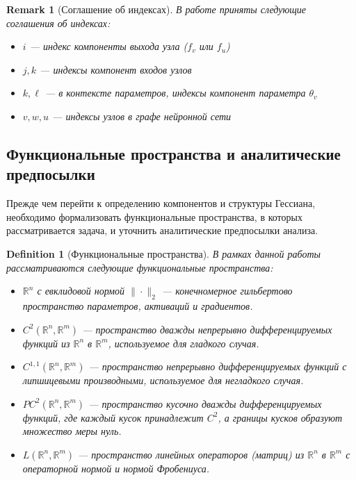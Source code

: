 \documentclass[11pt]{article}
\newtheorem{remark}{Remark}
\newtheorem{definition}{Definition}
\begin{document}
\begin{remark}[Соглашение об индексах]
  В работе приняты следующие соглашения об индексах:
  \begin{itemize}
    \item $i$ — индекс компоненты выхода узла ($f_v$ или $f_u$)
    \item $j, k$ — индексы компонент входов узлов
    \item $k, \ell$ — в контексте параметров, индексы компонент параметра $\theta_v$
    \item $v, w, u$ — индексы узлов в графе нейронной сети
  \end{itemize}
\end{remark}

\subsection{Функциональные пространства и аналитические предпосылки}

Прежде чем перейти к определению компонентов и структуры Гессиана, необходимо формализовать функциональные
пространства, в которых рассматривается задача, и уточнить аналитические предпосылки анализа.

\begin{definition}[Функциональные пространства]
  В рамках данной работы рассматриваются следующие функциональные пространства:
  \begin{itemize}
    \item $\mathbb{R}^n$ с евклидовой нормой $\|\cdot\|_2$ — конечномерное гильбертово пространство
      параметров, активаций и градиентов.
    \item $C^2(\mathbb{R}^n, \mathbb{R}^m)$ — пространство дважды непрерывно дифференцируемых функций из
      $\mathbb{R}^n$ в $\mathbb{R}^m$, используемое для гладкого случая.
    \item $C^{1,1}(\mathbb{R}^n, \mathbb{R}^m)$ — пространство непрерывно дифференцируемых функций с
      липшицевыми производными, используемое для негладкого случая.
    \item $PC^2(\mathbb{R}^n, \mathbb{R}^m)$ — пространство кусочно дважды дифференцируемых функций, где
      каждый кусок принадлежит $C^2$, а границы кусков образуют множество меры нуль.
    \item $L(\mathbb{R}^n, \mathbb{R}^m)$ — пространство линейных операторов (матриц) из $\mathbb{R}^n$ в
      $\mathbb{R}^m$ с операторной нормой и нормой Фробениуса.
  \end{itemize}
\end{definition}
\end{document}
